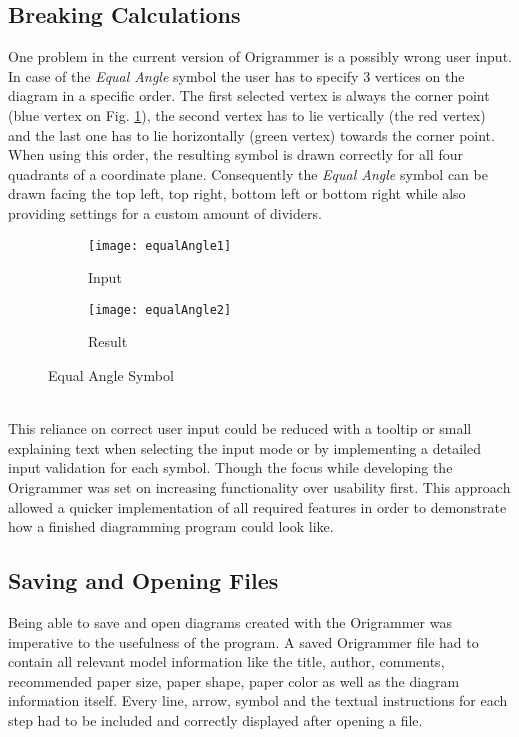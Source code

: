 \subsection{Breaking Calculations}
\label{sec:breakingCalc}
One problem in the current version of Origrammer is a possibly wrong user input. In case of the \emph{Equal Angle} symbol the user has to specify 3 vertices on the diagram in a specific order. The first selected vertex is always the corner point (blue vertex on Fig. \ref{fig:equalAngle1}), the second vertex has to lie vertically (the red vertex) and the last one has to lie horizontally (green vertex) towards the corner point. When using this order, the resulting symbol is drawn correctly for all four quadrants of a coordinate plane. Consequently the \emph{Equal Angle} symbol can be drawn facing the top left, top right, bottom left or bottom right while also providing settings for a custom amount of dividers.
\begin{figure*}[h]
    \centering
    \begin{subfigure}[b]{0.4\textwidth}
        \texttt{[image: equalAngle1]}
        \caption{Input}
        \label{fig:equalAngle1}
    \end{subfigure}
    \begin{subfigure}[b]{0.4\textwidth}
        \texttt{[image: equalAngle2]}
        \caption{Result}
        \label{fig:equalAngle2}
    \end{subfigure}
    \caption{Equal Angle Symbol}
\end{figure*}\\
This reliance on correct user input could be reduced with a tooltip or small explaining text when selecting the input mode or by implementing a detailed input validation for each symbol. Though the focus while developing the Origrammer was set on increasing functionality over usability first. This approach allowed a quicker implementation of all required features in order to demonstrate how a finished diagramming program could look like.


\subsection{Saving and Opening Files}

Being able to save and open diagrams created with the Origrammer was imperative to the usefulness of the program. A saved Origrammer file had to contain all relevant model information like the title, author, comments, recommended paper size, paper shape, paper color as well as the diagram information itself. Every line, arrow, symbol and the textual instructions for each step had to be included and correctly displayed after opening a file.


